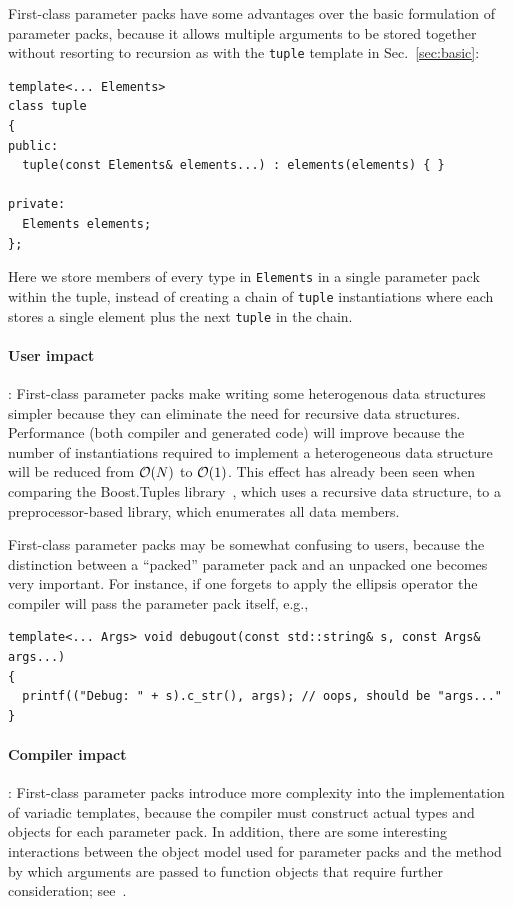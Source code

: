 \documentclass{article}
\begin{document}
First-class parameter packs have some advantages over the basic
formulation of parameter packs, because it allows multiple arguments
to be stored together without resorting to recursion as with the
\texttt{tuple} template in Sec.~\ref{sec:basic}:
\begin{verbatim}
template<... Elements> 
class tuple
{
public:
  tuple(const Elements& elements...) : elements(elements) { }

private:
  Elements elements;
};
\end{verbatim}

Here we store members of every type in \texttt{Elements} in a single
parameter pack within the tuple, instead of creating a chain of
\texttt{tuple} instantiations where each stores a single element plus
the next \texttt{tuple} in the chain. 

\paragraph{User impact}: First-class parameter packs make writing some
heterogenous data structures simpler because they can eliminate the
need for recursive data structures. Performance (both compiler and
generated code) will improve because the number of instantiations
required to implement a heterogeneous data structure will be reduced
from ${\cal O}(N)$ to ${\cal O}(1)$. This effect has already been seen
when comparing the Boost.Tuples library~\cite{Tuples01}, which uses a
recursive data structure, to a preprocessor-based library, which
enumerates all data members. 

First-class parameter packs may be somewhat confusing to users,
because the distinction between a ``packed'' parameter pack and an
unpacked one becomes very important. For instance, if one forgets to
apply the ellipsis operator the compiler will pass the parameter pack
itself, e.g.,
\begin{verbatim}
template<... Args> void debugout(const std::string& s, const Args& args...)
{
  printf(("Debug: " + s).c_str(), args); // oops, should be "args..."
}
\end{verbatim}

\paragraph{Compiler impact}: First-class parameter packs introduce
more complexity into the implementation of variadic templates, because
the compiler must construct actual types and objects for each
parameter pack. In addition, there are some interesting interactions
between the object model used for parameter packs and the method by
which arguments are passed to function objects that require further
consideration; see~\cite{GJP04a}. 
\end{document}
